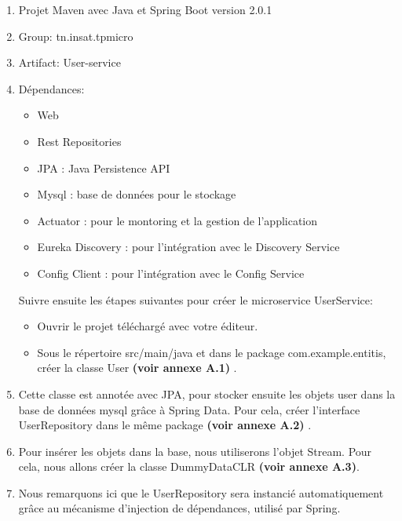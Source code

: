 \begin{enumerate}
       	\item  Projet Maven avec Java et Spring Boot version 2.0.1
		\item  Group: tn.insat.tpmicro
		\item  Artifact: User-service
		\item  Dépendances:
		
		\begin{itemize}
		  \item Web
		  \item Rest Repositories
		  \item JPA : Java Persistence API
		 \item Mysql : base de données pour le stockage
		 \item Actuator : pour le montoring et la gestion de l'application
		 \item  Eureka Discovery : pour l'intégration avec le Discovery Service
		 \item  Config Client : pour l'intégration avec le Config Service
		\end{itemize}
		



Suivre ensuite les étapes suivantes pour créer le microservice UserService:

\begin{itemize}
\item Ouvrir le projet téléchargé avec votre éditeur. 

\item Sous le répertoire src/main/java et dans le package com.example.entitis, créer la classe User  \textbf{(voir annexe A.1) }.
\end{itemize}



\item Cette classe est annotée avec JPA, pour stocker ensuite les objets user dans la base de données mysql grâce à Spring Data. Pour cela, créer l'interface UserRepository dans le même package  \textbf{(voir annexe A.2) }. 




\item Pour insérer les objets dans la base, nous utiliserons l'objet Stream. Pour cela, nous allons créer la classe DummyDataCLR \textbf{(voir annexe A.3)}.



\item Nous remarquons ici que le UserRepository sera instancié automatiquement grâce au mécanisme d'injection de dépendances, utilisé par Spring.


\end{enumerate}
